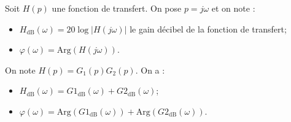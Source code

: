 \begin{defi}
Soit $H(p)$ une fonction de transfert. On pose $p=j\omega$ et on note :  \begin{itemize}
\item $H_{\text{dB}}\left( \omega\right) =20\log |H(j\omega)|$ le gain décibel de la fonction de transfert;
\item $\varphi\left( \omega\right) = \text{Arg}\left(H(j\omega) \right)$.
\end{itemize}
\end{defi}

\begin{prop}
On note $H(p)=G_1(p)G_2(p)$. On a :
\begin{itemize}
\item $H_{\text{dB}}\left( \omega\right) =G1_{\text{dB}}\left( \omega\right)+G2_{\text{dB}}\left( \omega\right)$;
\item $\varphi\left( \omega\right)  =\text{Arg}\left(G1_{\text{dB}}\left( \omega\right)\right)+\text{Arg}\left(G2_{\text{dB}}\left( \omega\right)\right)$.
\end{itemize}
\end{prop}
\vspace{-.8cm}

